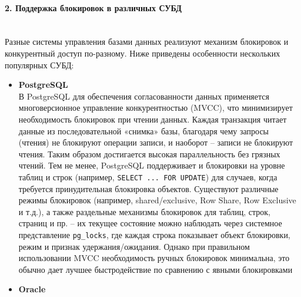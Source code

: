 \paragraph{2. Поддержка блокировок в различных СУБД} ~\\
 Разные системы управления базами данных реализуют механизм блокировок и конкурентный доступ по-разному. Ниже приведены особенности нескольких популярных СУБД: 
 \begin{itemize}
    \item \textbf{PostgreSQL} \autocite{PostgreSQLdocc52} ~\\
    В PostgreSQL для обеспечения согласованности данных применяется многоверсионное управление конкурентностью (MVCC), что минимизирует необходимость блокировок при чтении данных. Каждая транзакция читает данные из последовательной «снимка» базы, благодаря чему запросы (чтения) не блокируют операции записи, и наоборот – записи не блокируют чтения. Таким образом достигается высокая параллельность без грязных чтений. Тем не менее, PostgreSQL поддерживает и блокировки на уровне таблиц и строк (например, \texttt{SELECT ... FOR UPDATE}) для случаев, когда требуется принудительная блокировка объектов. Существуют различные режимы блокировок (например, shared/exclusive, Row Share, Row Exclusive и т.д.), а также раздельные механизмы блокировок для таблиц, строк, страниц и пр. – их текущее состояние можно наблюдать через системное представление \texttt{pg\_locks}, где каждая строка показывает объект блокировки, режим и признак удержания/ожидания. Однако при правильном использовании MVCC необходимость ручных блокировок минимальна, это обычно дает лучшее быстродействие по сравнению с явными блокировками
    \item \textbf{Oracle} \autocites{oracledbdoc5, oracleessentialsc7} ~\\

\end{itemize}
